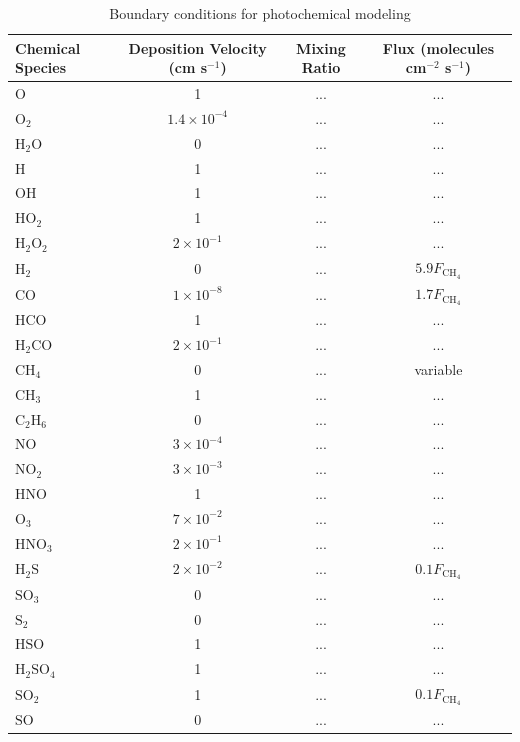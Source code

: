 \begin{table}[hbt!]
  \centering
  \begin{tabularx}{\textwidth}{l c c c} \caption{Boundary conditions for photochemical modeling} \label{tab:photochem_model} \\
  \hline \hline
  Chemical Species & Deposition Velocity (cm s$^{-1}$) & Mixing Ratio & Flux (molecules cm$^{-2}$ s$^{-1}$)   \\
  \hline
  $\mathrm{O}$ & 1 & ... & ... \\
  $\mathrm{O_2}$ & $1.4\times10^{-4}$ & ... & ... \\
  $\mathrm{H_2O}$ & 0 & ... & ... \\
  $\mathrm{H}$ & 1 & ... & ... \\
  $\mathrm{OH}$ & 1 & ... & ... \\
  $\mathrm{HO_2}$ & 1 & ... & ... \\
  $\mathrm{H_2O_2}$ & $2\times10^{-1}$ & ... & ... \\
  $\mathrm{H_2}$ & 0 & ... & $5.9F_\mathrm{CH_4}$ \\
  $\mathrm{CO}$ & $1\times10^{-8}$ & ... & $1.7F_\mathrm{CH_4}$ \\
  $\mathrm{HCO}$ & 1 & ... & ... \\
  $\mathrm{H_2CO}$ & $2\times10^{-1}$ & ... & ... \\
  $\mathrm{CH_4}$ & 0 & ... & variable \\
  $\mathrm{CH_3}$ & 1 & ... & ... \\
  $\mathrm{C_2H_6}$ & 0 & ... & ... \\
  $\mathrm{NO}$ & $3\times10^{-4}$ & ... & ... \\
  $\mathrm{NO_2}$ & $3\times10^{-3}$ & ... & ... \\
  $\mathrm{HNO}$ & 1 & ... & ... \\
  $\mathrm{O_3}$ & $7\times10^{-2}$ & ... & ... \\
  $\mathrm{HNO_3}$ & $2\times10^{-1}$ & ... & ... \\
  $\mathrm{H_2S}$ & $2\times10^{-2}$ & ... & $0.1F_\mathrm{CH_4}$ \\
  $\mathrm{SO_3}$ & 0 & ... & ... \\
  $\mathrm{S_2}$ & 0 & ... & ... \\
  $\mathrm{HSO}$ & 1 & ... & ... \\
  $\mathrm{H_2SO_4}$ & 1 & ... & ... \\
  $\mathrm{SO_2}$ & 1 & ... & $0.1F_\mathrm{CH_4}$ \\
  $\mathrm{SO}$ & 0 & ... & ... \\

\end{tabularx}
\end{table}
